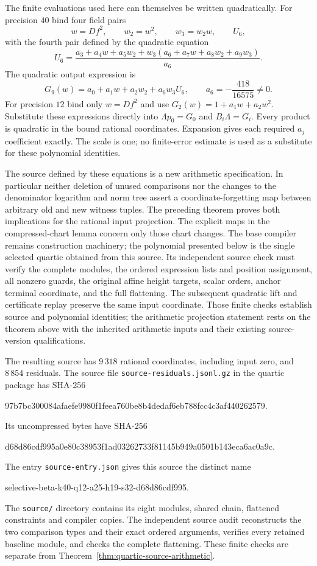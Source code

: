 \documentclass[11pt]{article}
\theoremstyle{definition}
\theoremstyle{remark}
\begin{document}
The finite evaluations used here can themselves be written quadratically.
For precision $40$ bind four field pairs
\[
 w=Df^2,\qquad w_2=w^2,\qquad w_3=w_2w,\qquad U_6,
\]
with the fourth pair defined by the quadratic equation
\[
 U_6=\frac{a_3+a_4w+a_5w_2+
                  w_3(a_6+a_7w+a_8w_2+a_9w_3)}{a_6}.
\]
The quadratic output expression is
\[
 G_9(w)=a_0+a_1w+a_2w_2+a_6w_3U_6,
 \qquad a_6=-\frac{418}{16575}\ne0.
\]
For precision $12$ bind only $w=Df^2$ and use
$G_2(w)=1+a_1w+a_2w^2$. Substitute these expressions directly into
$\Lambda p_0=G_0$ and $B_i\Lambda=G_i$. Every product is quadratic in
the bound rational coordinates. Expansion gives each required $a_j$
coefficient exactly. The scale is one; no finite-error estimate is used
as a substitute for these polynomial identities.

The source defined by these equations is a new arithmetic specification.
In particular neither deletion of unused comparisons nor the changes to
the denominator logarithm and norm tree assert a coordinate-forgetting
map between arbitrary old and new witness tuples. The preceding theorem
proves both implications for the rational input projection. The explicit
maps in the compressed-chart lemma concern only those chart changes.
The base compiler remains construction machinery; the polynomial
presented below is the single selected quartic obtained from this source.
Its independent source check must verify the complete modules, the
ordered expression lists and position assignment, all nonzero guards,
the original affine height targets, scalar orders, anchor terminal
coordinate, and the full flattening. The subsequent quadratic lift and
certificate replay preserve the same input coordinate. Those finite
checks establish source and polynomial identities; the arithmetic
projection statement rests on the theorem above with the inherited
arithmetic inputs and their existing source-version qualifications.


The resulting source has $9\,318$ rational coordinates, including input
zero, and $8\,854$ residuals. The source file
\nolinkurl{source-residuals.jsonl.gz} in the quartic package has SHA-256
\begin{center}\footnotesize\ttfamily
97b7bc300084afaefe9980f1feea760be8b4dedaf6eb788fcc4c3af440262579.
\end{center}
Its uncompressed bytes have SHA-256
\begin{center}\footnotesize\ttfamily
d68d86cdf995a0e80c38953f1ad03262733f81145b949a0501b143eca6ac0a9c.
\end{center}
The entry \nolinkurl{source-entry.json} gives this source the distinct name
\begin{center}\footnotesize\ttfamily
selective-beta-k40-q12-a25-h19-s32-d68d86cdf995.
\end{center}
The \nolinkurl{source/} directory contains its eight modules, shared
chain, flattened constraints and compiler copies. The independent source
audit reconstructs the two comparison types and their exact ordered
arguments, verifies every retained baseline module, and checks the
complete flattening. These finite checks are separate from
Theorem~\ref{thm:quartic-source-arithmetic}.
\end{document}
